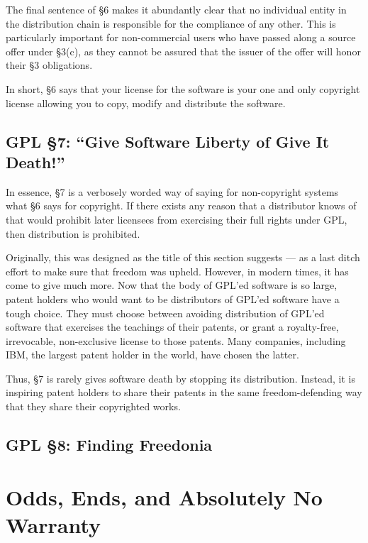 \documentclass[12pt]{report}
\begin{document}
The final sentence of \S 6 makes it abundantly clear that no individual
entity in the distribution chain is responsible for the compliance of any
other.  This is particularly important for non-commercial users who have
passed along a source offer under \S 3(c), as they cannot be assured that
the issuer of the offer will honor their \S 3 obligations.

In short, \S 6 says that your license for the software is your one and
only copyright license allowing you to copy, modify and distribute the
software.

\section{GPL \S 7: ``Give Software Liberty of Give It Death!''}
\label{GPLs7}

In essence, \S 7 is a verbosely worded way of saying for non-copyright
systems what \S 6 says for copyright.  If there exists any reason that a
distributor knows of that would prohibit later licensees from exercising
their full rights under GPL, then distribution is prohibited.

Originally, this was designed as the title of this section suggests --- as
a last ditch effort to make sure that freedom was upheld.  However, in
modern times, it has come to give much more.  Now that the body of GPL'ed
software is so large, patent holders who would want to be distributors of
GPL'ed software have a tough choice.  They must choose between avoiding
distribution of GPL'ed software that exercises the teachings of their
patents, or grant a royalty-free, irrevocable, non-exclusive license to
those patents.  Many companies, including IBM, the largest patent holder
in the world, have chosen the latter.

Thus, \S 7 is rarely gives software death by stopping its distribution.
Instead, it is inspiring patent holders to share their patents in the same
freedom-defending way that they share their copyrighted works.

\section{GPL \S 8: Finding Freedonia}
\label{GPLs8}


\chapter{Odds, Ends, and Absolutely No Warranty}
\end{document}
